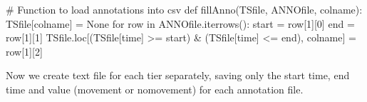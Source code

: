 \documentclass[
  letterpaper,
  DIV=11,
  numbers=noendperiod]{scrreprt}
\newenvironment{Shaded}{\begin{snugshade}}{\end{snugshade}}
\newcommand{\CommentTok}[1]{\textcolor[rgb]{0.37,0.37,0.37}{#1}}
\newcommand{\ControlFlowTok}[1]{\textcolor[rgb]{0.00,0.23,0.31}{#1}}
\newcommand{\DecValTok}[1]{\textcolor[rgb]{0.68,0.00,0.00}{#1}}
\newcommand{\KeywordTok}[1]{\textcolor[rgb]{0.00,0.23,0.31}{#1}}
\newcommand{\NormalTok}[1]{\textcolor[rgb]{0.00,0.23,0.31}{#1}}
\newcommand{\OperatorTok}[1]{\textcolor[rgb]{0.37,0.37,0.37}{#1}}
\newcommand{\StringTok}[1]{\textcolor[rgb]{0.13,0.47,0.30}{#1}}
\newcommand{\VariableTok}[1]{\textcolor[rgb]{0.07,0.07,0.07}{#1}}
\begin{document}
\begin{Shaded}
\begin{Highlighting}[]
\CommentTok{\# Function to load annotations into csv}
\KeywordTok{def}\NormalTok{ fillAnno(TSfile, ANNOfile, colname):}
\NormalTok{    TSfile[colname] }\OperatorTok{=} \VariableTok{None}
    \ControlFlowTok{for}\NormalTok{ row }\KeywordTok{in}\NormalTok{ ANNOfile.iterrows():}
\NormalTok{        start }\OperatorTok{=}\NormalTok{ row[}\DecValTok{1}\NormalTok{][}\DecValTok{0}\NormalTok{]}
\NormalTok{        end }\OperatorTok{=}\NormalTok{ row[}\DecValTok{1}\NormalTok{][}\DecValTok{1}\NormalTok{]}
\NormalTok{        TSfile.loc[(TSfile[}\StringTok{\textquotesingle{}time\textquotesingle{}}\NormalTok{] }\OperatorTok{\textgreater{}=}\NormalTok{ start) }\OperatorTok{\&}\NormalTok{ (TSfile[}\StringTok{\textquotesingle{}time\textquotesingle{}}\NormalTok{] }\OperatorTok{\textless{}=}\NormalTok{ end), colname] }\OperatorTok{=}\NormalTok{ row[}\DecValTok{1}\NormalTok{][}\DecValTok{2}\NormalTok{]}
\end{Highlighting}
\end{Shaded}

Now we create text file for each tier separately, saving only the start
time, end time and value (movement or nomovement) for each annotation
file.
\end{document}
